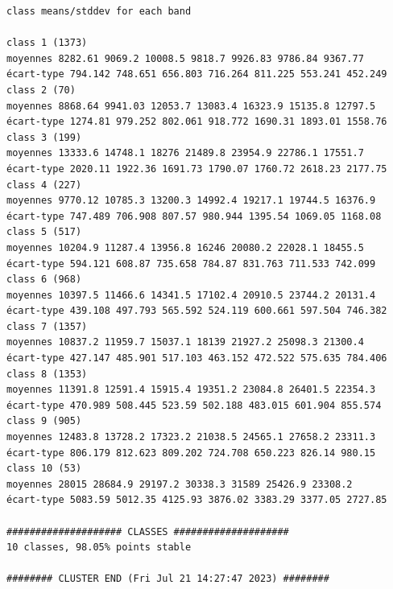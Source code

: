 \documentclass[environments,article,submit,pdftex,moreauthors]{Definitions/mdpi}
\begin{document}
\begin{scriptsize}
\begin{verbatim}
class means/stddev for each band

class 1 (1373)
moyennes 8282.61 9069.2 10008.5 9818.7 9926.83 9786.84 9367.77
écart-type 794.142 748.651 656.803 716.264 811.225 553.241 452.249
class 2 (70)
moyennes 8868.64 9941.03 12053.7 13083.4 16323.9 15135.8 12797.5
écart-type 1274.81 979.252 802.061 918.772 1690.31 1893.01 1558.76
class 3 (199)
moyennes 13333.6 14748.1 18276 21489.8 23954.9 22786.1 17551.7
écart-type 2020.11 1922.36 1691.73 1790.07 1760.72 2618.23 2177.75
class 4 (227)
moyennes 9770.12 10785.3 13200.3 14992.4 19217.1 19744.5 16376.9
écart-type 747.489 706.908 807.57 980.944 1395.54 1069.05 1168.08
class 5 (517)
moyennes 10204.9 11287.4 13956.8 16246 20080.2 22028.1 18455.5
écart-type 594.121 608.87 735.658 784.87 831.763 711.533 742.099
class 6 (968)
moyennes 10397.5 11466.6 14341.5 17102.4 20910.5 23744.2 20131.4
écart-type 439.108 497.793 565.592 524.119 600.661 597.504 746.382
class 7 (1357)
moyennes 10837.2 11959.7 15037.1 18139 21927.2 25098.3 21300.4
écart-type 427.147 485.901 517.103 463.152 472.522 575.635 784.406
class 8 (1353)
moyennes 11391.8 12591.4 15915.4 19351.2 23084.8 26401.5 22354.3
écart-type 470.989 508.445 523.59 502.188 483.015 601.904 855.574
class 9 (905)
moyennes 12483.8 13728.2 17323.2 21038.5 24565.1 27658.2 23311.3
écart-type 806.179 812.623 809.202 724.708 650.223 826.14 980.15
class 10 (53)
moyennes 28015 28684.9 29197.2 30338.3 31589 25426.9 23308.2
écart-type 5083.59 5012.35 4125.93 3876.02 3383.29 3377.05 2727.85

#################### CLASSES ####################
10 classes, 98.05% points stable

######## CLUSTER END (Fri Jul 21 14:27:47 2023) ########
\end{verbatim}
\end{scriptsize}
\end{document}
